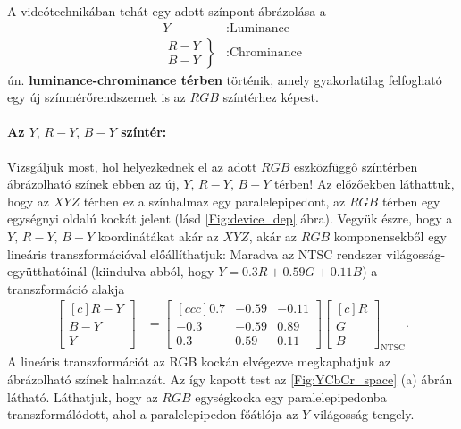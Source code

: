 A videótechnikában tehát egy adott színpont ábrázolása a
\begin{align*}
Y&: \text{Luminance }\\
 	\left.\begin{array}{lr}
        R-Y\\
        B-Y
        \end{array}\right\}&: \text{Chrominance}
\end{align*}
ún. \textbf{luminance-chrominance térben} történik, amely gyakorlatilag felfogható egy új színmérőrendszernek is az $RGB$ színtérhez képest.

\paragraph{Az $Y,\,R-Y,\,B-Y$ színtér:\\}
Vizsgáljuk most, hol helyezkednek el az adott $RGB$ eszközfüggő színtérben ábrázolható színek ebben az új, $Y,\, R-Y,\, B-Y$ térben!
Az előzőekben láthattuk, hogy az $XYZ$ térben ez a színhalmaz egy paralelepipedont, az $RGB$ térben egy egységnyi oldalú kockát jelent (lásd \ref{Fig:device_dep} ábra).
Vegyük észre, hogy a $Y,\, R-Y,\, B-Y$ koordinátákat akár az $XYZ$, akár az $RGB$ komponensekből egy lineáris transzformációval előállíthatjuk:
Maradva az NTSC rendszer világosság-együtthatóinál (kiindulva abból, hogy $Y = 0.3R + 0.59G + 0.11B$) a transzformáció alakja
\begin{align}
\begin{bmatrix}[c]
       R- Y \\[0.3em]
       B - Y \\[0.3em]
       Y \end{bmatrix} &= 
\begin{bmatrix}[c c c]
      0.7 &  -0.59&  -0.11  \\[0.3em]
       -0.3 &  -0.59 & 0.89  \\[0.3em]
      0.3 &  0.59&  0.11 \end{bmatrix} 
\begin{bmatrix}[c]
       R \\[0.3em]
       G \\[0.3em]
       B \end{bmatrix}_{\mathrm{NTSC}}.
\end{align}
A lineáris transzformációt az RGB kockán elvégezve megkaphatjuk az ábrázolható színek halmazát.
Az így kapott test az \ref{Fig:YCbCr_space} (a) ábrán látható.
Láthatjuk, hogy az $RGB$ egységkocka egy paralelepipedonba transzformálódott, ahol a paralelepipedon főátlója az $Y$ világosság tengely.
